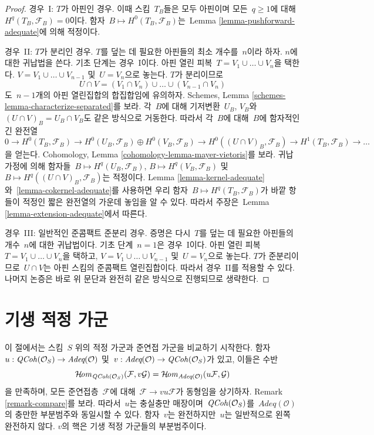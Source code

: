 \begin{proof}
\medskip\noindent
경우\  I: $T$가 아핀인 경우. 이때 스킴\  $T_B$들은 모두 아핀이며
모든\  $q \geq 1$에 대해\  $H^q(T_B, \mathcal{F}_B) = 0$이다.
함자\  $B \mapsto H^0(T_B, \mathcal{F}_B)$는\  Lemma
\ref{lemma-pushforward-adequate}에 의해 적정이다.

\medskip\noindent
경우\  II: $T$가 분리인 경우. $T$를 덮는 데 필요한 아핀들의 최소
개수를\  $n$이라 하자. $n$에 대한 귀납법을 쓴다. 기초 단계는
경우\  I이다. 아핀 열린 피복\  $T = V_1 \cup \ldots \cup V_n$을 택한다.
$V = V_1 \cup \ldots \cup V_{n - 1}$ 및\  $U = V_n$으로 놓는다.
$T$가 분리이므로
$$
U \cap V = (V_1 \cap V_n) \cup \ldots \cup (V_{n - 1} \cap V_n)
$$
도\  $n - 1$개의 아핀 열린집합의 합집합임에 유의하자. Schemes,
Lemma \ref{schemes-lemma-characterize-separated}를 보라. 각\  $B$에
대해 기저변환\  $U_B$, $V_B$와\ 
$(U \cap V)_B = U_B \cap V_B$도 같은 방식으로 거동한다. 따라서
각\  $B$에 대해\  $B$에 함자적인 긴 완전열
$$
0 \to
H^0(T_B, \mathcal{F}_B) \to
H^0(U_B, \mathcal{F}_B) \oplus H^0(V_B, \mathcal{F}_B) \to
H^0((U \cap V)_B, \mathcal{F}_B) \to
H^1(T_B, \mathcal{F}_B) \to \ldots
$$
을 얻는다. Cohomology, Lemma
\ref{cohomology-lemma-mayer-vietoris}를 보라. 귀납가정에 의해 함자들\ 
$B \mapsto H^q(U_B, \mathcal{F}_B)$,
$B \mapsto H^q(V_B, \mathcal{F}_B)$ 및\ 
$B \mapsto H^q((U \cap V)_B, \mathcal{F}_B)$는 적정이다.
Lemma \ref{lemma-kernel-adequate}와\ 
\ref{lemma-cokernel-adequate}를 사용하면 우리 함자\ 
$B \mapsto H^q(T_B, \mathcal{F}_B)$가 바깥 항들이 적정인 짧은
완전열의 가운데 놓임을 알 수 있다. 따라서 주장은\  Lemma
\ref{lemma-extension-adequate}에서 따른다.

\medskip\noindent
경우\  III: 일반적인 준콤팩트 준분리 경우. 증명은 다시\  $T$를 덮는
데 필요한 아핀들의 개수\  $n$에 대한 귀납법이다. 기초 단계\ 
$n = 1$은 경우\  I이다. 아핀 열린 피복\ 
$T = V_1 \cup \ldots \cup V_n$을 택하고,
$V = V_1 \cup \ldots \cup V_{n - 1}$ 및\  $U = V_n$으로 놓는다.
$T$가 준분리이므로\  $U \cap V$는 아핀 스킴의 준콤팩트 열린집합이다.
따라서 경우\  II를 적용할 수 있다. 나머지 논증은 바로 위 문단과
완전히 같은 방식으로 진행되므로 생략한다.
\end{proof}







\section{기생 적정 가군}
\label{section-parasitic}

\noindent
이 절에서는 스킴\  $S$ 위의 적정 가군과 준연접 가군을 비교하기
시작한다. 함자\ 
$u : \mathit{QCoh}(\mathcal{O}_S) \to \textit{Adeq}(\mathcal{O})$
및\ 
$v : \textit{Adeq}(\mathcal{O}) \to \mathit{QCoh}(\mathcal{O}_S)$가 있고,
이들은 수반
$$
\mathop{\mathcal{H}\!\mathit{om}}\nolimits_{\mathit{QCoh}(\mathcal{O}_S)}(\mathcal{F}, v\mathcal{G})
=
\mathop{\mathcal{H}\!\mathit{om}}\nolimits_{\textit{Adeq}(\mathcal{O})}(u\mathcal{F}, \mathcal{G})
$$
을 만족하며, 모든 준연접층\  $\mathcal{F}$에 대해\ 
$\mathcal{F} \to vu\mathcal{F}$가 동형임을 상기하자. Remark
\ref{remark-compare}를 보라. 따라서\  $u$는 충실충만 매장이며\ 
$\mathit{QCoh}(\mathcal{O}_S)$를\  $\textit{Adeq}(\mathcal{O})$의 충만한
부분범주와 동일시할 수 있다. 함자\  $v$는 완전하지만\  $u$는
일반적으로 왼쪽 완전하지 않다. $v$의 핵은 기생 적정 가군들의
부분범주이다.

